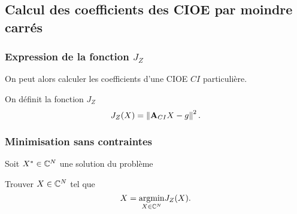   \subsection{Calcul des coefficients des CIOE par moindre carrés}

    \subsubsection[Expression de la fonction JZ]{Expression de la fonction \(J_Z\)}
      On peut alors calculer les coefficients d'une CIOE \(CI\) particulière.
      \begin{defn}
        On définit la fonction \(J_Z\)
        \begin{equation*}
          J_Z(X) = \left\lVert{\mathbf{A}}_{CI}X - {g}\right\rVert^2.
        \end{equation*}
      \end{defn}

    \subsubsection{Minimisation sans contraintes}

      \begin{defn}
        Soit \(X^* \in \mathbb C^N\) une solution du problème 

        Trouver \(X \in \mathbb C^N\) tel que
        \begin{equation*}
          X = {\underset{X\in \mathbb C^N}{\operatorname{argmin}}} J_Z(X).
        \end{equation*}
      \end{defn}




